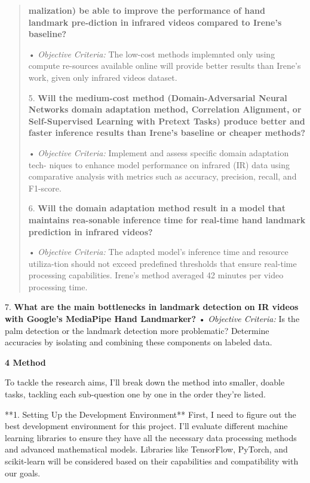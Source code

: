 \documentclass[
]{article}
\begin{document}
\begin{quote}
\textbf{malization) be able to improve the performance of hand landmark
pre-diction in infrared videos compared to Irene's baseline?}

• \emph{Objective Criteria:} The low-cost methods implemnted only using
compute re-sources available online will provide better results than
Irene's work, given only infrared videos dataset.

5. \textbf{Will the medium-cost method (Domain-Adversarial Neural
Networks domain adaptation method, Correlation Alignment, or
Self-Supervised Learning with Pretext Tasks) produce better and faster
inference results than Irene's baseline or cheaper methods?}

• \emph{Objective Criteria:} Implement and assess specific domain
adaptation tech- niques to enhance model performance on infrared (IR)
data using comparative analysis with metrics such as accuracy,
precision, recall, and F1-score.

6. \textbf{Will the domain adaptation method result in a model that
maintains rea-sonable inference time for real-time hand landmark
prediction in infrared videos?}

• \emph{Objective Criteria:} The adapted model's inference time and
resource utiliza-tion should not exceed predefined thresholds that
ensure real-time processing capabilities. Irene's method averaged 42
minutes per video processing time.
\end{quote}

7. \textbf{What are the main bottlenecks in landmark detection on IR videos with Google's MediaPipe Hand Landmarker?}
• \emph{Objective Criteria:} Is the palm detection or the landmark detection more problematic? 
Determine accuracies by isolating and combining these components on labeled data.


\textbf{4 Method}

To tackle the research aims, I'll break down the method into smaller,
doable tasks, tackling each sub-question one by one in the order they're
listed.

**1. Setting Up the Development Environment** First, I need to figure
out the best development environment for this project. I'll evaluate
different machine learning libraries to ensure they have all the
necessary data processing methods and advanced mathematical models.
Libraries like TensorFlow, PyTorch, and scikit-learn will be considered
based on their capabilities and compatibility with our goals.
\end{document}
